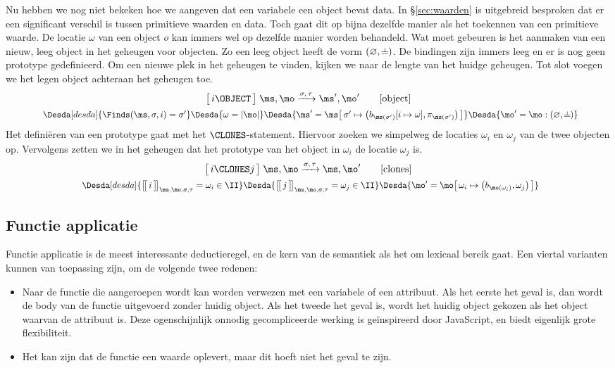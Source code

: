 Nu hebben we nog niet bekeken hoe we aangeven dat een variabele een object bevat data. In §\ref{sec:waarden} is uitgebreid besproken dat er een significant verschil is tussen primitieve waarden en data. Toch gaat dit op bijna dezelfde manier als het toekennen van een primitieve waarde. De locatie $\omega$ van een object $o$ kan immers wel op dezelfde manier worden behandeld. Wat moet gebeuren is het aanmaken van een nieuw, leeg object in het geheugen voor objecten. Zo een leeg object heeft de vorm $(\varnothing, \nil)$. De bindingen zijn immers leeg en er is nog geen prototype gedefinieerd. Om een nieuwe plek in het geheugen te vinden, kijken we naar de lengte van het huidge geheugen. Tot slot voegen we het legen object achteraan het geheugen toe.
%
\begin{gather*}
  \Terminates{i \OBJECT}
    {\ms, \mo}
    {\sigma, \tau}
    {\ms', \mo'}
  \tag*{[object]} \\
  \Desdas{
    \Desda[desda]{\Finds(\ms, \sigma, i) = \sigma'}
    \Desda{\omega = |\mo|}
    \Desda{\ms' = \ms \surr{ \sigma' \mapsto \big(b_{\ms(\sigma')}[i\mapsto \omega], \pi_{\ms(\sigma')}\big) }}
    \Desda{\mo' = \mo : (\varnothing,\nil)}
  }
\end{gather*}
%
Het definiëren van een prototype gaat met het $\CLONES$-statement. Hiervoor zoeken we simpelweg de locaties $\omega_i$ en $\omega_j$ van de twee objecten op. Vervolgens zetten we in het geheugen dat het prototype van het object in $\omega_i$ de locatie $\omega_j$ is.
%
\begin{gather*}
  \Terminates{i \CLONES j}
    {\ms, \mo}
    {\sigma, \tau}
    {\ms, \mo'}
  \tag*{[clones]} \\
  \Desdas{
    \Desda[desda]{\Express{i}{\ms,\mo,\sigma,\tau} = \omega_i \in \II}
    \Desda{\Express{j}{\ms,\mo,\sigma,\tau} = \omega_j \in \II}
    \Desda{\mo' = \mo \surr{ \omega_i \mapsto \big(b_{\mo(\omega_i)}, \omega_j\big) }}
  }
\end{gather*}

\subsection{Functie applicatie}

Functie applicatie is de meest interessante deductieregel, en de kern van de semantiek als het om lexicaal bereik gaat. Een viertal varianten kunnen van toepassing zijn, om de volgende twee redenen:
\begin{itemize}
  \item Naar de functie die aangeroepen wordt kan worden verwezen met een variabele of een attribuut. Als het eerste het geval is, dan wordt de body van de functie uitgevoerd zonder huidig object. Als het tweede het geval is, wordt het huidig object gekozen als het object waarvan de attribuut is. Deze ogenschijnlijk onnodig gecompliceerde werking is geïnspireerd door JavaScript, en biedt eigenlijk grote flexibiliteit.
  \item Het kan zijn dat de functie een waarde oplevert, maar dit hoeft niet het geval te zijn.
\end{itemize}

